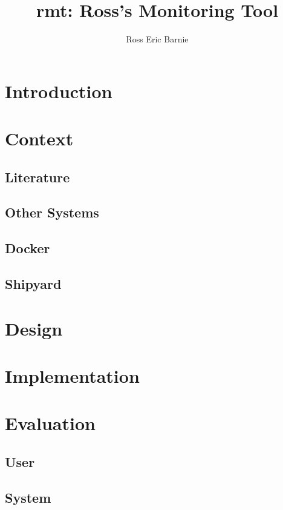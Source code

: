 \documentclass{l4proj}
\title{rmt: Ross's Monitoring Tool}
\author{Ross Eric Barnie}
\begin{document}
\maketitle
\tableofcontents

\chapter{Introduction}


\chapter{Context}
\section{Literature}
\section{Other Systems}
\section{Docker}
\section{Shipyard}

\chapter{Design}

\chapter{Implementation}

\chapter{Evaluation}
\section{User}
\section{System}



\end{document}

